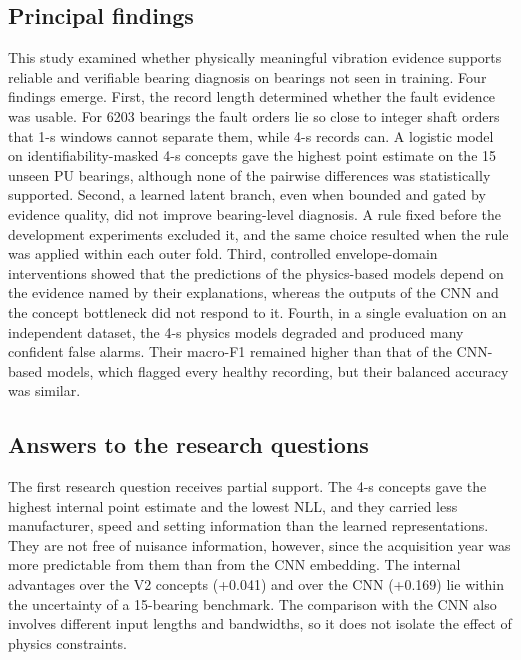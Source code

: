 \documentclass[10pt,letterpaper]{article}
\begin{document}
\subsection*{Principal findings}
This study examined whether physically meaningful vibration evidence supports reliable and verifiable bearing diagnosis on bearings not seen in training. Four findings emerge. First, the record length determined whether the fault evidence was usable. For 6203 bearings the fault orders lie so close to integer shaft orders that 1-s windows cannot separate them, while 4-s records can. A logistic model on identifiability-masked 4-s concepts gave the highest point estimate on the 15 unseen PU bearings, although none of the pairwise differences was statistically supported. Second, a learned latent branch, even when bounded and gated by evidence quality, did not improve bearing-level diagnosis. A rule fixed before the development experiments excluded it, and the same choice resulted when the rule was applied within each outer fold. Third, controlled envelope-domain interventions showed that the predictions of the physics-based models depend on the evidence named by their explanations, whereas the outputs of the CNN and the concept bottleneck did not respond to it. Fourth, in a single evaluation on an independent dataset, the 4-s physics models degraded and produced many confident false alarms. Their macro-F1 remained higher than that of the CNN-based models, which flagged every healthy recording, but their balanced accuracy was similar.

\subsection*{Answers to the research questions}
The first research question receives partial support. The 4-s concepts gave the highest internal point estimate and the lowest NLL, and they carried less manufacturer, speed and setting information than the learned representations. They are not free of nuisance information, however, since the acquisition year was more predictable from them than from the CNN embedding. The internal advantages over the V2 concepts (+0.041) and over the CNN (+0.169) lie within the uncertainty of a 15-bearing benchmark. The comparison with the CNN also involves different input lengths and bandwidths, so it does not isolate the effect of physics constraints.
\end{document}
